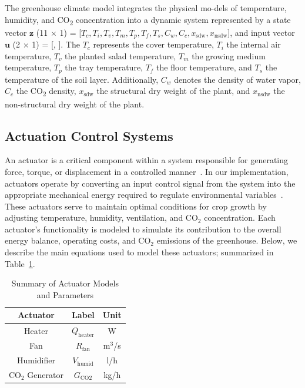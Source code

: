 \documentclass[conference]{IEEEtran}
\begin{document}
The greenhouse climate model integrates the physical mo-dels of temperature, humidity, and CO\textsubscript{2} concentration into a dynamic system represented by a state vector \(\mathbf{z}\) (11 \(\times \) 1) = [\(T_c, T_i, T_v, T_m, T_p, T_f, T_s, C_w, C_c, x_{\text{sdw}}, x_{\text{nsdw}}\)], and input vector \(\mathbf{u}\) (2 \(\times \) 1) = [, ]. The \(T_c\) represents the cover temperature, \(T_i\) the internal air temperature, \(T_v\) the planted salad temperature, \(T_m\) the growing medium temperature, \(T_p\) the tray temperature, \(T_f\) the floor temperature, and \(T_s\) the temperature of the soil layer. Additionally, \(C_w\) denotes the density of water vapor, \(C_c\) the CO\textsubscript{2} density, \(x_{\text{sdw}}\) the structural dry weight of the plant, and \(x_{\text{nsdw}}\) the non-structural dry weight of the plant.

\subsection{Actuation Control Systems}

An actuator is a critical component within a system responsible for generating force, torque, or displacement in a controlled manner~\cite{Escudier2019}. In our implementation, actuators operate by converting an input control signal from the system into the appropriate mechanical energy required to regulate environmental variables~\cite{Butterfield2018}. These actuators serve to maintain optimal conditions for crop growth by adjusting temperature, humidity, ventilation, and CO$_2$ concentration. Each actuator's functionality is modeled to simulate its contribution to the overall energy balance, operating costs, and CO$_2$ emissions of the greenhouse. Below, we describe the main equations used to model these actuators; summarized in Table~\ref{tab:actuators}.

\begin{table}
\centering
\caption{Summary of Actuator Models and Parameters}
\label{tab:actuators}
\begin{tabular}{ c c c }
\hline
Actuator & Label & Unit \\
\hline
Heater & \( Q_{\text{heater}} \) & W \\
Fan & \( R_{\text{fan}} \) & m$^3$/s \\
Humidifier & \( V_{\text{humid}} \) & l/h \\
CO$_2$ Generator & \( G_{\text{CO2}} \) & kg/h \\
\hline
\end{tabular}
\end{table}
\end{document}
